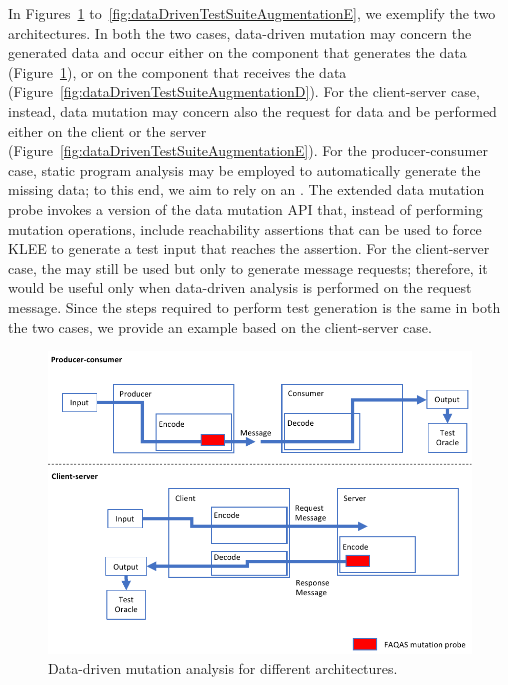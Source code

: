 In Figures~\ref{fig:dataDrivenTestSuiteAugmentationC} to~\ref{fig:dataDrivenTestSuiteAugmentationE}, we exemplify the two architectures. In both the two cases, data-driven mutation may concern the generated data and occur either on the component that generates the data (Figure~\ref{fig:dataDrivenTestSuiteAugmentationC}), or on the component that receives the data (Figure~\ref{fig:dataDrivenTestSuiteAugmentationD}).
For the client-server case, instead, data mutation may concern also the request for data and be performed either on the client or the server (Figure~\ref{fig:dataDrivenTestSuiteAugmentationE}). For the producer-consumer case, static program analysis may be employed to automatically generate the missing data; to this end, we aim to rely on an . 
The extended data mutation probe invokes a version of the data mutation API that, instead of performing mutation operations, include reachability assertions that can be used to force KLEE to generate a test input that reaches the assertion. 
For the client-server case, the  may still be used but only to generate message requests; therefore, it would be useful only when data-driven analysis is performed on the  request message. Since the steps required to perform test generation is the same in both the two cases, we provide an example based on the client-server case.

\begin{figure}[h]
  \centering
    \includegraphics[width=14cm]{images/dataDrivenTestSuiteAugmentationC}
      \caption{Data-driven mutation analysis for different architectures.}
      \label{fig:dataDrivenTestSuiteAugmentationC}
\end{figure}

